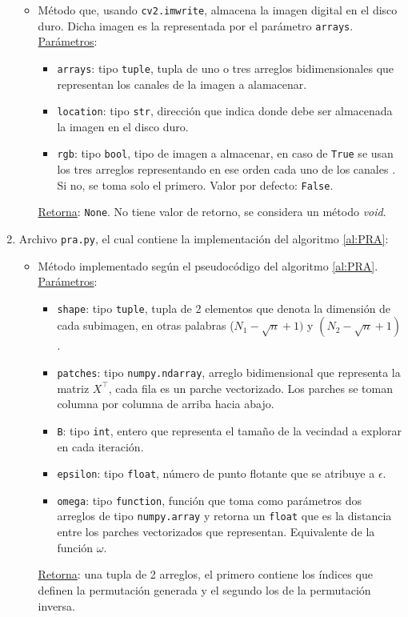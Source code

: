\begin{enumerate}
\begin{itemize}
		\item {}
		
		M\'etodo que, usando \texttt{cv2.imwrite}, almacena la imagen digital en el disco duro. Dicha imagen es la representada por el par\'ametro \texttt{arrays}. \underline{Par\'ametros}:
		\begin{itemize}
			\item \texttt{arrays}: tipo \texttt{tuple}, tupla de uno o tres arreglos bidimensionales que representan los canales de la imagen a alamacenar.
			\item \texttt{location}: tipo \texttt{str}, direcci\'on que indica donde debe ser almacenada la imagen en el disco duro.
			\item \texttt{rgb}: tipo \texttt{bool}, tipo de imagen a almacenar, en caso de \texttt{True} se usan los tres arreglos representando en ese orden cada uno de los canales \RGB. Si no, se toma solo el primero. Valor por defecto: \texttt{False}. 
		\end{itemize}
		\underline{Retorna}: \texttt{None}. No tiene valor de retorno, se considera un m\'etodo \textit{void}.
	\end{itemize}
	
	\item Archivo \texttt{pra.py}, el cual contiene la implementaci\'on del algoritmo \ref{al:PRA}:
	\begin{itemize}
		\item {}
		
		M\'etodo implementado seg\'un el pseudoc\'odigo del algoritmo \ref{al:PRA}. \underline{Par\'ametros}:
		\begin{itemize}
			\item \texttt{shape}: tipo \texttt{tuple}, tupla de 2 elementos que denota la dimensi\'on de cada subimagen, en otras palabras ($N_1 - \sqrt{n} + 1)$ y $(N_2 - \sqrt{n} + 1)$.
			\item \texttt{patches}: tipo \texttt{numpy.ndarray}, arreglo bidimensional que representa la matriz $X^\intercal$, cada fila es un parche vectorizado. Los parches se toman columna por columna de arriba hacia abajo.
			\item \texttt{B}: tipo \texttt{int}, entero que representa el tamaño de la vecindad a explorar en cada iteraci\'on.
			\item \texttt{epsilon}: tipo \texttt{float}, n\'umero de punto flotante que se atribuye a $\epsilon$.
			\item \texttt{omega}: tipo \texttt{function}, funci\'on que toma como par\'ametros dos arreglos de tipo \texttt{numpy.array} y retorna un \texttt{float} que es la distancia entre los parches vectorizados que representan. Equivalente de la funci\'on $\omega$.
		\end{itemize}
		\underline{Retorna}: una tupla de 2 arreglos, el primero contiene los \'indices que definen la permutaci\'on generada y el segundo los de la permutaci\'on inversa.
	\end{itemize}
	

\end{enumerate}
